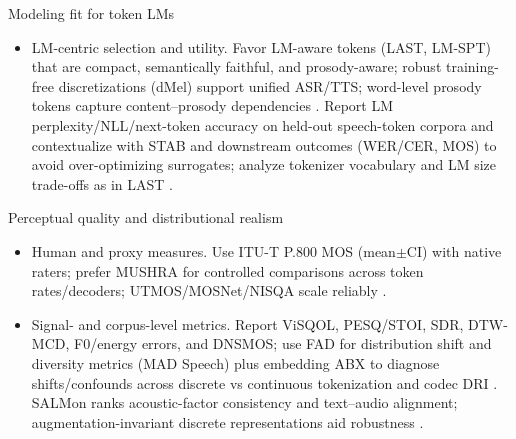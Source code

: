 \documentclass{article}
\begin{document}
Modeling fit for token LMs
\begin{itemize}
  \item LM-centric selection and utility. Favor LM-aware tokens (LAST, LM-SPT) that are compact, semantically faithful, and prosody-aware; robust training-free discretizations (dMel) support unified ASR/TTS; word-level prosody tokens capture content--prosody dependencies \cite{turetzky2024lastlanguagemodelawarespeechtokenization,jo2025lmsptalignedsemanticdistillationspeechto,bai2025dmelspeechtokenizationmadesimple,qian2025prosodylmuncoveringemergingprosodyproces}. Report LM perplexity/NLL/next-token accuracy on held-out speech-token corpora and contextualize with STAB and downstream outcomes (WER/CER, MOS) to avoid over-optimizing surrogates; analyze tokenizer vocabulary and LM size trade-offs as in LAST \cite{vashishth2024stabspeechtokenizerassessmentbenchmark,turetzky2024lastlanguagemodelawarespeechtokenization}.
\end{itemize}

Perceptual quality and distributional realism
\begin{itemize}
  \item Human and proxy measures. Use ITU-T P.800 MOS (mean$\pm$CI) with native raters; prefer MUSHRA for controlled comparisons across token rates/decoders; UTMOS/MOSNet/NISQA scale reliably \cite{nakata2024jchatjapaneselargescalespokendialoguecor,yang2025diffsoundstreamefficientspeechtokenizati}.
  \item Signal- and corpus-level metrics. Report ViSQOL, PESQ/STOI, SDR, DTW-MCD, F0/energy errors, and DNSMOS; use FAD for distribution shift and diversity metrics (MAD Speech) plus embedding ABX to diagnose shifts/confounds across discrete vs continuous tokenization and codec DRI \cite{fily2024establishingdegreesclosenessbetweenaudio,futeral2025madspeechmeasuresacousticdiversity,li2025continuousspeechtokenizertext,liu2024analyzingmitigatinginconsistencydiscrete}. SALMon ranks acoustic-factor consistency and text--audio alignment; augmentation-invariant discrete representations aid robustness \cite{maimon2025salmonsuiteacousticlanguagemodelevaluati,entry2025augmentationinvariantdiscreterepresentat}.
\end{itemize}
\end{document}
